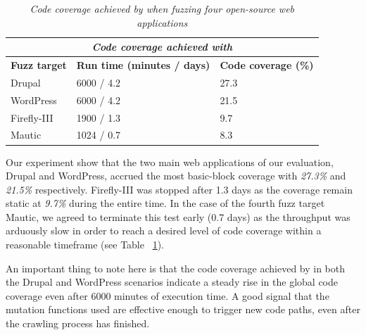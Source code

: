 \begin{table}[h]
\centering
 \begin{tabular}{@{}|l|l|l|@{}}
 \hline
 \multicolumn{3}{|c|}{\textit{\textbf{Code coverage achieved with \pname{} }}} \\
 \hline
 \textbf{Fuzz target} & \textbf{Run time (minutes / days)} & \textbf{Code coverage (\%)} \\ 
 \hline\hline
 Drupal & 6000 / 4.2 & 27.3 \\ 
 \hline
 WordPress & 6000 / 4.2 & 21.5 \\ 
 \hline
 Firefly-III & 1900 / 1.3 & 9.7 \\ 
 \hline
 Mautic & 1024 / 0.7 & 8.3 \\ 
 \hline
 \end{tabular}
 \captionsetup{justification=centering}
 \caption[Code coverage achieved by \pname{}]{\textit{Code coverage achieved by \pname{} when fuzzing four open-source web applications}}

 \label{coverage_table}
\end{table}

Our experiment show that the two main web applications of our evaluation, Drupal and WordPress, accrued the most basic-block coverage with \emph{27.3\%} and \emph{21.5\%} respectively. Firefly-III was stopped after 1.3 days as the coverage remain static at \emph{9.7\%} during the entire time. In the case of the fourth fuzz target Mautic, we agreed to terminate this test early (0.7 days) as the throughput was arduously slow in order to reach a desired level of code coverage within a reasonable timeframe (see Table ~\ref{coverage_table}). 

An important thing to note here is that the code coverage achieved by \pname{} in both the Drupal and WordPress scenarios indicate a steady rise in the global code coverage even after 6000 minutes of execution time. A good signal that the mutation functions used are effective enough to trigger new code paths, even after the crawling process has finished. 
 
